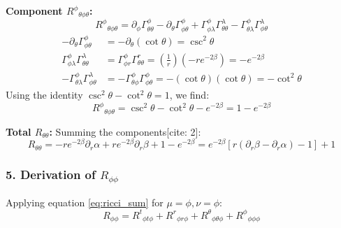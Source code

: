 \documentclass[11pt, a4paper]{report}
\begin{document}
\textbf{Component ${R^\phi}_{\theta\phi\theta}$:}
\begin{equation}
    {R^\phi}_{\theta\phi\theta} = \partial_\phi \Gamma^\phi_{\theta\theta} - \partial_\theta \Gamma^\phi_{\phi\theta} + \Gamma^\phi_{\phi\lambda}\Gamma^\lambda_{\theta\theta} - \Gamma^\phi_{\theta\lambda}\Gamma^\lambda_{\phi\theta}
\end{equation}
\begin{align}
    -\partial_\theta \Gamma^\phi_{\phi\theta} &= -\partial_\theta (\cot\theta) = \csc^2\theta \\
    \Gamma^\phi_{\phi\lambda}\Gamma^\lambda_{\theta\theta} &= \Gamma^\phi_{\phi r}\Gamma^r_{\theta\theta} = \left(\frac{1}{r}\right) \left( -r e^{-2\beta} \right) = -e^{-2\beta} \\
    -\Gamma^\phi_{\theta\lambda}\Gamma^\lambda_{\phi\theta} &= -\Gamma^\phi_{\theta\phi}\Gamma^\phi_{\phi\theta} = -(\cot\theta)(\cot\theta) = -\cot^2\theta
\end{align}
Using the identity $\csc^2\theta - \cot^2\theta = 1$, we find:
\begin{equation}
    {R^\phi}_{\theta\phi\theta} = \csc^2\theta - \cot^2\theta - e^{-2\beta} = 1 - e^{-2\beta}
\end{equation}

\textbf{Total $R_{\theta\theta}$:}
Summing the components[cite: 2]:
\begin{equation}
    R_{\theta\theta} = -r e^{-2\beta} \partial_r \alpha + r e^{-2\beta} \partial_r \beta + 1 - e^{-2\beta} = e^{-2\beta} \left[ r(\partial_r \beta - \partial_r \alpha) - 1 \right] + 1
\end{equation}

\subsubsection*{5. Derivation of $R_{\phi\phi}$}

Applying equation \eqref{eq:ricci_sum} for $\mu=\phi, \nu=\phi$:
\begin{equation}
    R_{\phi\phi} = {R^t}_{\phi t\phi} + {R^r}_{\phi r\phi} + {R^\theta}_{\phi\theta\phi} + {R^\phi}_{\phi\phi\phi}
\end{equation}
\end{document}
